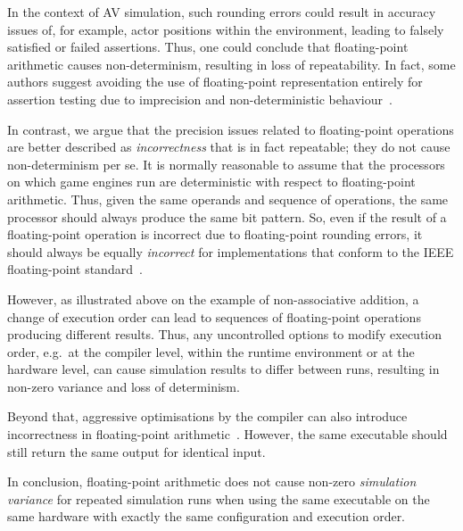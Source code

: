 \documentclass[letterpaper, 10 pt, journal, twoside]{IEEEtran}
\begin{document}
In the context of AV simulation, such rounding errors could result in accuracy issues of, for example, actor positions within the environment, leading to falsely satisfied or failed assertions.
%
Thus, one could conclude that floating-point arithmetic causes non-determinism, resulting in loss of repeatability. In fact, some authors suggest avoiding the use of floating-point representation entirely for assertion testing due to imprecision and non-deterministic behaviour~\cite{empirical-analysis-of-flaky-tests}. 


In contrast, we argue that the precision issues related to floating-point operations are better described as \textit{incorrectness} that is in fact repeatable; they do not cause non-determinism per se. 
%
It is normally reasonable to assume that the processors on which game engines run are deterministic with respect to floating-point arithmetic. 
%
Thus, given the same operands and sequence of operations, the same processor should always produce the same bit pattern. %
%
So, even if the result of a floating-point operation is incorrect due to floating-point rounding errors, it should always be equally \textit{incorrect} for implementations that conform to the IEEE floating-point standard~\cite{8766229}.

However, as illustrated above on the example of non-associative addition, a change of execution order can lead to sequences of floating-point operations producing different results. Thus, any uncontrolled options to modify execution order, e.g.\ at the compiler level, within the runtime environment or at the hardware level, can cause simulation results to differ between runs, resulting in non-zero variance and loss of determinism. 
 
Beyond that, aggressive optimisations by the compiler can also introduce incorrectness in floating-point arithmetic~\cite{llvm-floating-point}. However, the same executable should still return the same output for identical input. 

In conclusion, floating-point arithmetic does not cause non-zero \textit{simulation variance} for repeated simulation runs when using the same executable on the same hardware with exactly the same configuration and execution order.
\end{document}
